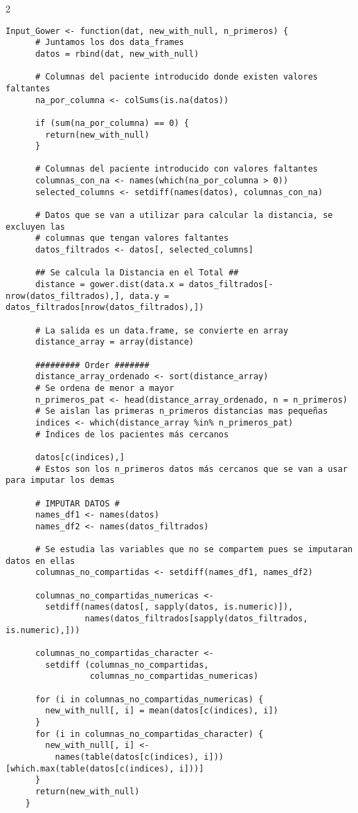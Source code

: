 \begin{longtable}{2} %
  \begin{lstlisting}[style=mystyle]
    Input_Gower <- function(dat, new_with_null, n_primeros) {
      # Juntamos los dos data_frames
      datos = rbind(dat, new_with_null)
      
      # Columnas del paciente introducido donde existen valores faltantes
      na_por_columna <- colSums(is.na(datos))
      
      if (sum(na_por_columna) == 0) {
        return(new_with_null)
      }
      
      # Columnas del paciente introducido con valores faltantes
      columnas_con_na <- names(which(na_por_columna > 0))
      selected_columns <- setdiff(names(datos), columnas_con_na)
      
      # Datos que se van a utilizar para calcular la distancia, se excluyen las
      # columnas que tengan valores faltantes
      datos_filtrados <- datos[, selected_columns]
      
      ## Se calcula la Distancia en el Total ##
      distance = gower.dist(data.x = datos_filtrados[-nrow(datos_filtrados),], data.y =  datos_filtrados[nrow(datos_filtrados),])
      
      # La salida es un data.frame, se convierte en array
      distance_array = array(distance)
      
      ######### Order #######
      distance_array_ordenado <- sort(distance_array)
      # Se ordena de menor a mayor
      n_primeros_pat <- head(distance_array_ordenado, n = n_primeros)
      # Se aislan las primeras n_primeros distancias mas pequeñas
      indices <- which(distance_array %in% n_primeros_pat)
      # Índices de los pacientes más cercanos
      
      datos[c(indices),]
      # Estos son los n_primeros datos más cercanos que se van a usar para imputar los demas
      
      # IMPUTAR DATOS #
      names_df1 <- names(datos)
      names_df2 <- names(datos_filtrados)
      
      # Se estudia las variables que no se compartem pues se imputaran datos en ellas
      columnas_no_compartidas <- setdiff(names_df1, names_df2)
      
      columnas_no_compartidas_numericas <-
        setdiff(names(datos[, sapply(datos, is.numeric)]),
                names(datos_filtrados[sapply(datos_filtrados, is.numeric),]))
    
      columnas_no_compartidas_character <-
        setdiff (columnas_no_compartidas,
                 columnas_no_compartidas_numericas)
      
      for (i in columnas_no_compartidas_numericas) {
        new_with_null[, i] = mean(datos[c(indices), i])
      }
      for (i in columnas_no_compartidas_character) {
        new_with_null[, i] <-
          names(table(datos[c(indices), i]))[which.max(table(datos[c(indices), i]))]
      }
      return(new_with_null)
    }
  \end{lstlisting}
\end{longtable}

